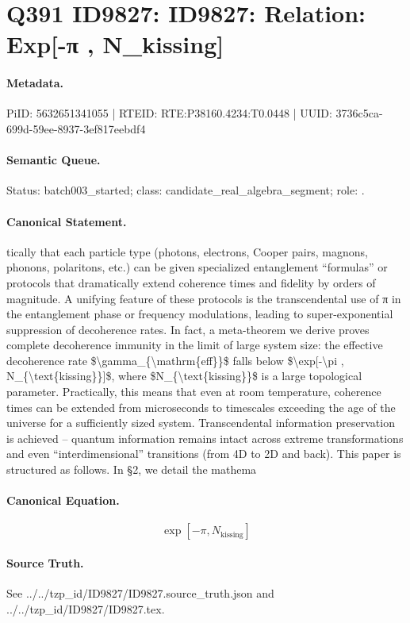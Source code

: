 \section*{Q391 ID9827: ID9827: Relation: Exp[-π , N\_kissing]}
\paragraph{Metadata.}
PiID: 5632651341055 | RTEID: RTE:P38160.4234:T0.0448 | UUID: 3736c5ca-699d-59ee-8937-3ef817eebdf4

\paragraph{Semantic Queue.}
Status: batch003\_started; class: candidate\_real\_algebra\_segment; role: .

\paragraph{Canonical Statement.}
tically that each particle type (photons, electrons, Cooper pairs, magnons, phonons, polaritons, etc.) can be given specialized entanglement “formulas” or protocols that dramatically extend coherence times and fidelity by orders of magnitude. A unifying feature of these protocols is the transcendental use of π in the entanglement phase or frequency modulations, leading to super-exponential suppression of decoherence rates. In fact, a meta-theorem we derive proves complete decoherence immunity in the limit of large system size: the effective decoherence rate \$\textbackslash{}gamma\_\{\textbackslash{}mathrm\{eff\}\}\$ falls below \$\textbackslash{}exp[-\textbackslash{}pi , N\_\{\textbackslash{}text\{kissing\}\}]\$, where \$N\_\{\textbackslash{}text\{kissing\}\}\$ is a large topological parameter. Practically, this means that even at room temperature, coherence times can be extended from microseconds to timescales exceeding the age of the universe for a sufficiently sized system. Transcendental information preservation is achieved – quantum information remains intact across extreme transformations and even “interdimensional” transitions (from 4D to 2D and back). This paper is structured as follows. In §2, we detail the mathema

\paragraph{Canonical Equation.}
\[
\exp[-\pi , N_{\text{kissing}}]
\]

\paragraph{Source Truth.}
See ../../tzp\_id/ID9827/ID9827.source\_truth.json and ../../tzp\_id/ID9827/ID9827.tex.
